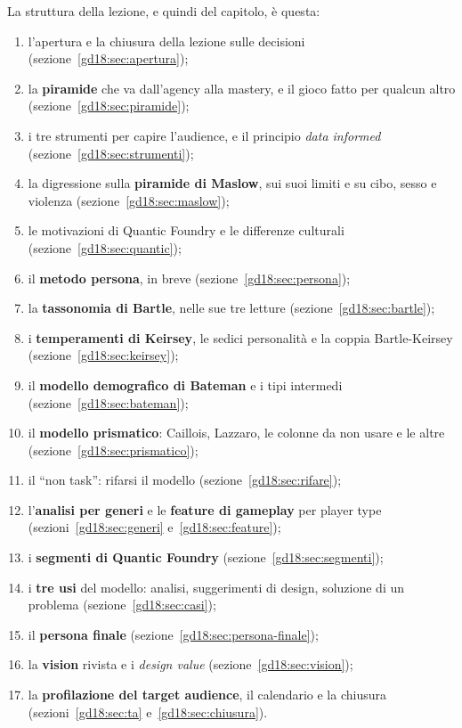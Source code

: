 La struttura della lezione, e quindi del capitolo, è questa:
\begin{enumerate}
  \item l'apertura e la chiusura della lezione sulle decisioni
        (sezione~\ref{gd18:sec:apertura});
  \item la \textbf{piramide} che va dall'agency alla mastery, e il gioco fatto per
        qualcun altro (sezione~\ref{gd18:sec:piramide});
  \item i tre strumenti per capire l'audience, e il principio \emph{data informed}
        (sezione~\ref{gd18:sec:strumenti});
  \item la digressione sulla \textbf{piramide di Maslow}, sui suoi limiti e su cibo,
        sesso e violenza (sezione~\ref{gd18:sec:maslow});
  \item le motivazioni di Quantic Foundry e le differenze culturali
        (sezione~\ref{gd18:sec:quantic});
  \item il \textbf{metodo persona}, in breve (sezione~\ref{gd18:sec:persona});
  \item la \textbf{tassonomia di Bartle}, nelle sue tre letture
        (sezione~\ref{gd18:sec:bartle});
  \item i \textbf{temperamenti di Keirsey}, le sedici personalità e la coppia
        Bartle-Keirsey (sezione~\ref{gd18:sec:keirsey});
  \item il \textbf{modello demografico di Bateman} e i tipi intermedi
        (sezione~\ref{gd18:sec:bateman});
  \item il \textbf{modello prismatico}: Caillois, Lazzaro, le colonne da non usare e
        le altre (sezione~\ref{gd18:sec:prismatico});
  \item il ``non task'': rifarsi il modello (sezione~\ref{gd18:sec:rifare});
  \item l'\textbf{analisi per generi} e le \textbf{feature di gameplay} per player
        type (sezioni~\ref{gd18:sec:generi} e~\ref{gd18:sec:feature});
  \item i \textbf{segmenti di Quantic Foundry} (sezione~\ref{gd18:sec:segmenti});
  \item i \textbf{tre usi} del modello: analisi, suggerimenti di design, soluzione
        di un problema (sezione~\ref{gd18:sec:casi});
  \item il \textbf{persona finale} (sezione~\ref{gd18:sec:persona-finale});
  \item la \textbf{vision} rivista e i \emph{design value}
        (sezione~\ref{gd18:sec:vision});
  \item la \textbf{profilazione del target audience}, il calendario e la chiusura
        (sezioni~\ref{gd18:sec:ta} e~\ref{gd18:sec:chiusura}).
\end{enumerate}

